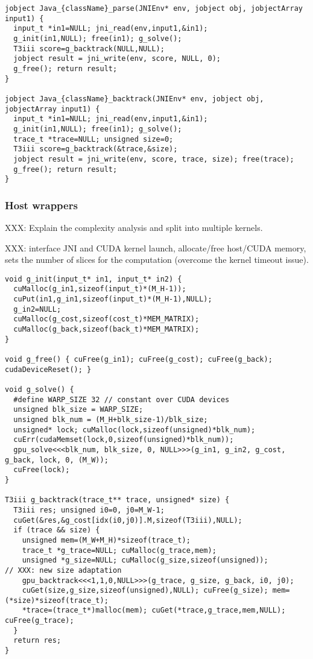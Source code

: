 \begin{verbatim}
jobject Java_{className}_parse(JNIEnv* env, jobject obj, jobjectArray input1) {
  input_t *in1=NULL; jni_read(env,input1,&in1);
  g_init(in1,NULL); free(in1); g_solve();
  T3iii score=g_backtrack(NULL,NULL);
  jobject result = jni_write(env, score, NULL, 0);
  g_free(); return result;
}

jobject Java_{className}_backtrack(JNIEnv* env, jobject obj, jobjectArray input1) {
  input_t *in1=NULL; jni_read(env,input1,&in1);
  g_init(in1,NULL); free(in1); g_solve();
  trace_t *trace=NULL; unsigned size=0;
  T3iii score=g_backtrack(&trace,&size);
  jobject result = jni_write(env, score, trace, size); free(trace);
  g_free(); return result;
}
\end{verbatim}

\subsubsection{Host wrappers}
XXX: Explain the complexity analysis and split into multiple kernels.

XXX: interface JNI and CUDA kernel launch, allocate/free host/CUDA memory, sets the number of slices for the computation (overcome the kernel timeout issue).

\begin{verbatim}
void g_init(input_t* in1, input_t* in2) {
  cuMalloc(g_in1,sizeof(input_t)*(M_H-1));
  cuPut(in1,g_in1,sizeof(input_t)*(M_H-1),NULL);
  g_in2=NULL;
  cuMalloc(g_cost,sizeof(cost_t)*MEM_MATRIX);
  cuMalloc(g_back,sizeof(back_t)*MEM_MATRIX);
}

void g_free() { cuFree(g_in1); cuFree(g_cost); cuFree(g_back); cudaDeviceReset(); }

void g_solve() {
  #define WARP_SIZE 32 // constant over CUDA devices
  unsigned blk_size = WARP_SIZE;
  unsigned blk_num = (M_H+blk_size-1)/blk_size;
  unsigned* lock; cuMalloc(lock,sizeof(unsigned)*blk_num);
  cuErr(cudaMemset(lock,0,sizeof(unsigned)*blk_num));
  gpu_solve<<<blk_num, blk_size, 0, NULL>>>(g_in1, g_in2, g_cost, g_back, lock, 0, (M_W));
  cuFree(lock);
}

T3iii g_backtrack(trace_t** trace, unsigned* size) {
  T3iii res; unsigned i0=0, j0=M_W-1;
  cuGet(&res,&g_cost[idx(i0,j0)].M,sizeof(T3iii),NULL);
  if (trace && size) {
    unsigned mem=(M_W+M_H)*sizeof(trace_t);
    trace_t *g_trace=NULL; cuMalloc(g_trace,mem);
    unsigned *g_size=NULL; cuMalloc(g_size,sizeof(unsigned));
// XXX: new size adaptation
    gpu_backtrack<<<1,1,0,NULL>>>(g_trace, g_size, g_back, i0, j0);
    cuGet(size,g_size,sizeof(unsigned),NULL); cuFree(g_size); mem=(*size)*sizeof(trace_t);
    *trace=(trace_t*)malloc(mem); cuGet(*trace,g_trace,mem,NULL); cuFree(g_trace);
  }
  return res;
}
\end{verbatim}

